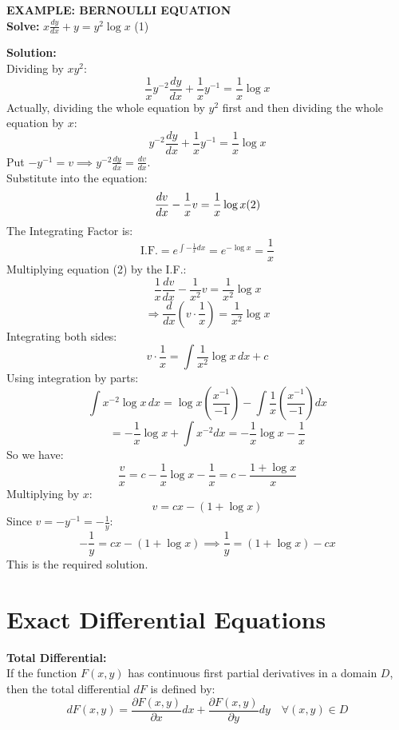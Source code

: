 \documentclass[11pt,a4paper]{article}
\begin{document}
\begin{tcolorbox}[colback=LightBg, colframe=BorderGray, arc=4mm]
    {\small\textbf{\textcolor{AccentBlue}{EXAMPLE: BERNOULLI EQUATION}}}
    \vspace{0.2cm}\\
    \textbf{Solve:} $\displaystyle x\frac{dy}{dx} + y = y^2 \log x$ \hfill (1)
    
    \vspace{0.2cm}
    \textbf{Solution:} \\
    Dividing by $xy^2$:
    \[ \frac{1}{x}y^{-2}\frac{dy}{dx} + \frac{1}{x}y^{-1} = \frac{1}{x}\log x \]
    Actually, dividing the whole equation by $y^2$ first and then dividing the whole equation by $x$:
    \[ y^{-2}\frac{dy}{dx} + \frac{1}{x}y^{-1} = \frac{1}{x}\log x \]
    Put $-y^{-1} = v \implies y^{-2}\frac{dy}{dx} = \frac{dv}{dx}$. \\
    Substitute into the equation:
    \[ \frac{dv}{dx} - \frac{1}{x}v = \frac{1}{x}\log x \hfill (2) \]
    The Integrating Factor is:
    \[ \text{I.F.} = e^{\int -\frac{1}{x} dx} = e^{-\log x} = \frac{1}{x} \]
    Multiplying equation (2) by the I.F.:
    \[ \frac{1}{x}\frac{dv}{dx} - \frac{1}{x^2}v = \frac{1}{x^2}\log x \]
    \[ \Rightarrow \frac{d}{dx} \left( v \cdot \frac{1}{x} \right) = \frac{1}{x^2}\log x \]
    Integrating both sides:
    \[ v \cdot \frac{1}{x} = \int \frac{1}{x^2}\log x \, dx + c \]
    Using integration by parts:
    \[ \int x^{-2}\log x \, dx = \log x \left(\frac{x^{-1}}{-1}\right) - \int \frac{1}{x} \left(\frac{x^{-1}}{-1}\right) dx \]
    \[ = -\frac{1}{x}\log x + \int x^{-2} dx = -\frac{1}{x}\log x - \frac{1}{x} \]
    So we have:
    \[ \frac{v}{x} = c - \frac{1}{x}\log x - \frac{1}{x} = c - \frac{1 + \log x}{x} \]
    Multiplying by $x$:
    \[ v = cx - (1 + \log x) \]
    Since $v = -y^{-1} = -\frac{1}{y}$:
    \[ -\frac{1}{y} = cx - (1 + \log x) \implies \frac{1}{y} = (1 + \log x) - cx \]
    This is the required solution.
\end{tcolorbox}

\section{Exact Differential Equations}

\textbf{\textcolor{DeepNavy}{Total Differential:}} \\
If the function $F(x,y)$ has continuous first partial derivatives in a domain $D$, then the total differential $dF$ is defined by:
\[ dF(x,y) = \frac{\partial F(x,y)}{\partial x}dx + \frac{\partial F(x,y)}{\partial y}dy \quad \forall (x,y) \in D \]
\end{document}

